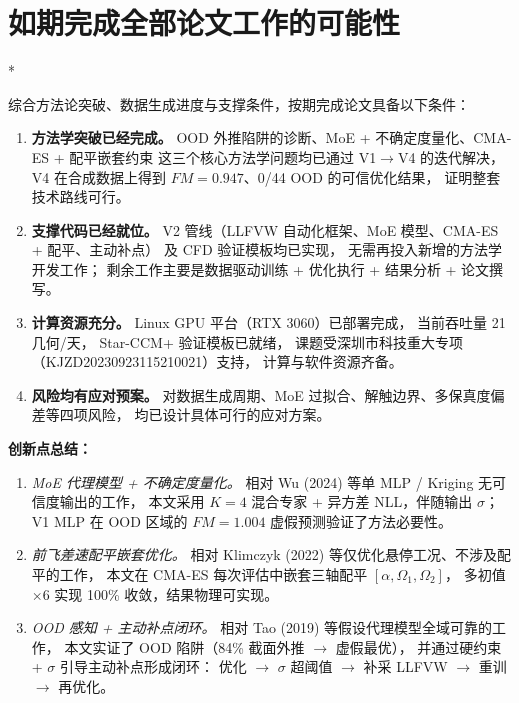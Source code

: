 \section{如期完成全部论文工作的可能性}*

综合方法论突破、数据生成进度与支撑条件，按期完成论文具备以下条件：

\begin{enumerate}
  \item \textbf{方法学突破已经完成。}
        OOD 外推陷阱的诊断、MoE + 不确定度量化、CMA-ES + 配平嵌套约束
        这三个核心方法学问题均已通过 V1$\rightarrow$V4 的迭代解决，
        V4 在合成数据上得到 $FM=0.947$、0/44 OOD 的可信优化结果，
        证明整套技术路线可行。
  \item \textbf{支撑代码已经就位。}
        V2 管线（LLFVW 自动化框架、MoE 模型、CMA-ES + 配平、主动补点）
        及 CFD 验证模板均已实现，
        无需再投入新增的方法学开发工作；
        剩余工作主要是数据驱动训练 + 优化执行 + 结果分析 + 论文撰写。
  \item \textbf{计算资源充分。}
        Linux GPU 平台（RTX 3060）已部署完成，
        当前吞吐量 21 几何/天，
        Star-CCM+ 验证模板已就绪，
        课题受深圳市科技重大专项（KJZD20230923115210021）支持，
        计算与软件资源齐备。
  \item \textbf{风险均有应对预案。}
        对数据生成周期、MoE 过拟合、解触边界、多保真度偏差等四项风险，
        均已设计具体可行的应对方案。
\end{enumerate}

\textbf{创新点总结：}
\begin{enumerate}
  \item \emph{MoE 代理模型 + 不确定度量化。}
        相对 Wu (2024) 等单 MLP / Kriging 无可信度输出的工作，
        本文采用 $K=4$ 混合专家 + 异方差 NLL，伴随输出 $\sigma$；
        V1 MLP 在 OOD 区域的 $FM=1.004$ 虚假预测验证了方法必要性。
  \item \emph{前飞差速配平嵌套优化。}
        相对 Klimczyk (2022) 等仅优化悬停工况、不涉及配平的工作，
        本文在 CMA-ES 每次评估中嵌套三轴配平 $[\alpha, \Omega_1, \Omega_2]$，
        多初值 $\times 6$ 实现 100\% 收敛，结果物理可实现。
  \item \emph{OOD 感知 + 主动补点闭环。}
        相对 Tao (2019) 等假设代理模型全域可靠的工作，
        本文实证了 OOD 陷阱（84\% 截面外推 $\rightarrow$ 虚假最优），
        并通过硬约束 + $\sigma$ 引导主动补点形成闭环：
        优化 $\rightarrow$ $\sigma$ 超阈值 $\rightarrow$ 补采 LLFVW $\rightarrow$ 重训 $\rightarrow$ 再优化。
\end{enumerate}

